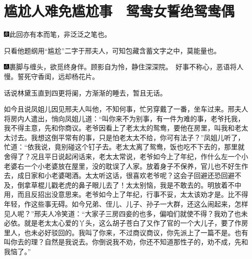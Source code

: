 

\chapter{尴尬人难免尴尬事　鸳鸯女誓绝鸳鸯偶}

{\includegraphics[width=3mm]{../Images/00004}此回亦有本而笔，非泛泛之笔也。}

{只看他题纲用``尴尬''二字于邢夫人，可知包藏含蓄文字之中，莫能量也。}

{\includegraphics[width=3mm]{../Images/00005}裹脚与缠头，欲觅终身伴。顾影自为怜，静住深深院。　好事不称心，恶语将人慢。誓死守香闺，远却杨花片。}

话说林黛玉直到四更将阑，方渐渐的睡去，暂且无话。

如今且说凤姐儿因见邢夫人叫他，不知何事，忙另穿戴了一番，坐车过来。邢夫人将房内人遣出，悄向凤姐儿道：``叫你来不为别事，有一件为难的事，老爷托我，我不得主意，先和你商议。老爷因看上了老太太的鸳鸯，要他在房里，叫我和老太太讨去。我想这倒平常有的事，只是怕老太太不给，你可有法子？''凤姐儿听了，忙道：``依我说，竟别碰这个钉子去。老太太离了鸳鸯，饭也吃不下去的，那里就舍得了？况且平日说起闲话来，老太太常说，老爷如今上了年纪，作什么左一个小老婆右一个小老婆放在屋里，没的耽误了人家。放着身子不保养，官儿也不好生作去，成日家和小老婆喝酒。太太听这话，很喜欢老爷呢？这会子回避还恐回避不及，倒拿草棍儿戳老虎的鼻子眼儿去了！太太别恼，我是不敢去的。明放着不中用，而且反招出没意思来。老爷如今上了年纪，行事不妥，太太该劝才是。比不得年轻，作这些事无碍。如今兄弟、侄儿、儿子、孙子一大群，还这么闹起来，怎样见人呢？''邢夫人冷笑道：``大家子三房四妾的也多，偏咱们就使不得？我劝了也未必依。就是老太太心爱的丫头，这么胡子苍白了又作了官的一个大儿子，要了作房里人，也未必好驳回的。我叫了你来，不过商议商议，你先派上了一篇不是。也有叫你去的理？自然是我说去。你倒说我不劝，你还不知道那性子的，劝不成，先和我恼了。''

